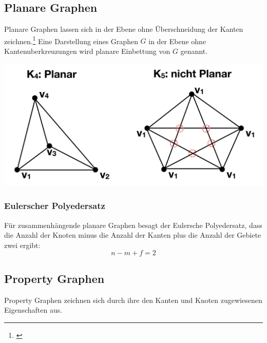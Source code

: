 \subsection{Planare Graphen}
Planare Graphen lassen sich in der Ebene ohne Überschneidung der Kanten zeichnen.\footnote{\cite{Theobald2016}}
Eine Darstellung eines Graphen $G$ in der Ebene ohne Kantenuberkreuzungen wird planare Einbettung von $G$ genannt.

\begin{center}
	\includegraphics[scale = 0.5]{./images/planarer_graph.png}
\end{center}
\subsubsection{Eulerscher Polyedersatz}
Für zusammenhängende planare Graphen besagt der Eulersche Polyedersatz, dass die Anzahl der Knoten minus die Anzahl der Kanten plus die Anzahl der Gebiete zwei ergibt:
\[ n - m + f = 2 \]
\subsection{Property Graphen}
Property Graphen zeichnen sich durch ihre den Kanten und Knoten zugewiesenen Eigenschaften aus.
